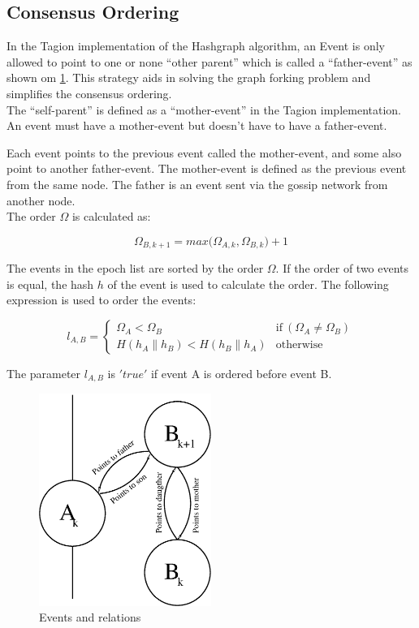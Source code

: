 \subsection{Consensus Ordering}
In the Tagion implementation of the Hashgraph algorithm, an Event is only allowed to point to one or none ``other parent'' which is called a ``father-event'' as shown om \cref{fig:consensus_order}. This strategy aids in solving the graph forking problem and simplifies the consensus ordering.\\
The ``self-parent'' is defined as a ``mother-event'' in the Tagion implementation. An event must have a mother-event but doesn't have to have a father-event.

Each event points to the previous event called the mother-event, and some also point to another father-event. The mother-event is defined as the previous event from the same node. The father is an event sent via the gossip network from another node. \\

The order $\Omega$ is calculated as:

\begin{equation}
 \Omega_{B,k+1} = max \big(\Omega_{A,k} , \Omega_{B,k} \big) +1
\end{equation}

The events in the epoch list are sorted by the order $\Omega$. If the order of two events is equal, the hash $h$ of the event is used to calculate the order.
The following expression is used to order the events:

\begin{equation}
 {l}_{A,B} = 
    \begin{cases}
        {{\Omega}_{A} < {\Omega}_{B}} & 
        \text{if}  ~ ({\Omega}_{A} \neq {\Omega}_{B} )  \\ 
        H (    {h}_{A} \parallel {h}_{B} )  < H (    {h}_{B} \parallel {h}_{A} ) & 
        \text{otherwise}
    \end{cases}
\end{equation}

The parameter ${l}_{A,B}$ is $'true'$ if event A is ordered before event B.

\begin{figure}[H]
 \centering
 \includegraphics[width=0.5\textwidth]{fig/consensus_order.eps}
 \caption{Events and relations}
 \label{fig:consensus_order}
\end{figure}
